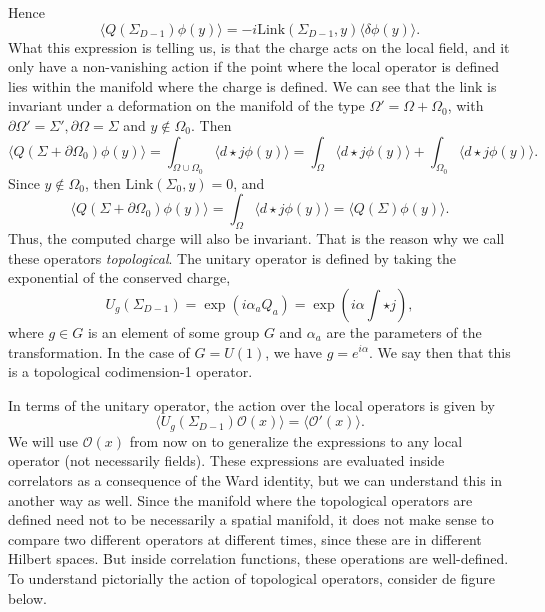 \documentclass{article}
\begin{document}
Hence
\begin{equation}
	\langle Q(\Sigma_{D-1})\phi(y)\rangle=-i\text{Link}(\Sigma_{D-1},y)\langle\delta\phi(y)\rangle.
\end{equation}
What this expression is telling us, is that the charge acts on the local field, and it only have a non-vanishing action if the point where the local operator is defined lies within the manifold where the charge is defined. We can see that the link is invariant under a deformation on the manifold of the type $\Omega'=\Omega+\Omega_0$, with $\partial \Omega' = \Sigma',\partial \Omega = \Sigma$ and $y\not\in\Omega_0.$ Then 
\begin{equation}
	\langle Q(\Sigma + \partial\Omega_0)\phi(y)\rangle=\int_{\Omega\cup\Omega_0}\langle d\star j\phi(y)\rangle=\int_{\Omega}\langle d\star j\phi(y)\rangle+\int_{\Omega_0}\langle d\star j\phi(y)\rangle.
\end{equation}
Since $y\not\in\Omega_0$, then $\text{Link}(\Sigma_0,y)=0$, and
\begin{equation}
	\langle Q(\Sigma+\partial\Omega_0)\phi(y)\rangle=\int_{\Omega}\langle d\star j\phi(y)\rangle=\langle Q(\Sigma)\phi(y)\rangle.
\end{equation}
Thus, the computed charge will also be invariant. That is the reason why we call these operators \textit{topological}. The unitary operator is defined by taking the exponential of the conserved charge,
\begin{equation}
	U_g(\Sigma_{D-1})=\exp(i\alpha_aQ_a)=\exp\left(i\alpha\int\star j\right),
\end{equation}
where $g\in G$  is an element of some group $G$ and $\alpha_a$ are the parameters of the transformation. In the case of  $G=U(1)$,  we have $g=e^{i\alpha}$.  We say then that this is a topological codimension-1 operator. 

In terms of the unitary operator, the action over the local operators is given by
\begin{equation}
	\langle U_g(\Sigma_{D-1})\mathcal{O}(x)\rangle=\langle\mathcal{O}'(x)\rangle.
\end{equation}
We will use $\mathcal{O}(x)$ from now on to generalize the expressions to any local operator (not necessarily fields).  These expressions are evaluated inside correlators as a consequence of the Ward identity, but we can understand this in another way as well. Since the manifold where the topological operators are defined need not to be necessarily a spatial manifold, it does not make sense to compare two different operators at different times, since these are in different Hilbert spaces. But inside correlation functions, these operations are well-defined. To understand pictorially the action of topological operators, consider de figure below.
\end{document}
